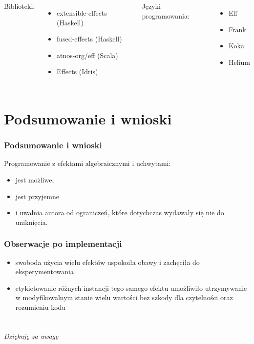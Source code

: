 \documentclass[polish, 13pt, usenames, dvipsnames]{beamer}
\begin{document}
\begin{frame}
  \frametitle{}
  \begin{columns}
    \column{.4\paperwidth}
    Biblioteki:
    \begin{itemize}
      \item extensible-effects (Haskell)
      \item fused-effects (Haskell)
      \item atnos-org/eff (Scala)
      \item Effects (Idris)
    \end{itemize}
    \column{.4\paperwidth}
    Języki programowania:
    \begin{itemize}
      \item Eff
      \item Frank
      \item Koka
      \item Helium
    \end{itemize}
  \end{columns}
\end{frame}

\newcommand{\inl}[1]{\lstinline[style=Haleff-inl]{#1}}
\lstset{language=Haleff, showstringspaces=false}

\section{Podsumowanie i wnioski}

\begin{frame}
  \frametitle{Podsumowanie i wnioski}
  Programowanie z efektami algebraicznymi i uchwytami:
  \begin{itemize}
  \item jest możliwe,
  \item jest przyjemne
  \item i uwalnia autora od ograniczeń, które dotychczas wydawały się nie do uniknięcia.
  \end{itemize}
\end{frame}

\begin{frame}
  \frametitle{Obserwacje po implementacji}
  \begin{itemize}
  \item swoboda użycia wielu efektów uspokoiła obawy i zachęciła do eksperymentowania
  \item etykietowanie różnych instancji tego samego efektu umożliwiło utrzymywanie w modyfikowalnym stanie wielu wartości bez szkody dla czytelności oraz rozumieniu kodu
  \end{itemize}
\end{frame}

\section{}

\begin{frame}{}
  \vspace{2em}
  \centering
  \Large\emph{Dziękuję za uwagę}
\end{frame}
\end{document}
